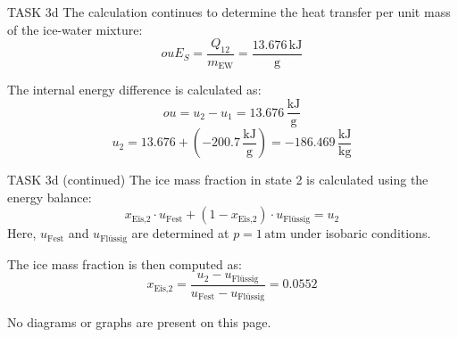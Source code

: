 TASK 3d  
The calculation continues to determine the heat transfer per unit mass of the ice-water mixture:  
\[
ouE_{S} = \frac{Q_{12}}{m_{\text{EW}}} = \frac{13.676 \, \text{kJ}}{\text{g}}
\]  

The internal energy difference is calculated as:  
\[
ou = u_2 - u_1 = 13.676 \, \frac{\text{kJ}}{\text{g}}
\]  
\[
u_2 = 13.676 + (-200.7 \, \frac{\text{kJ}}{\text{g}}) = -186.469 \, \frac{\text{kJ}}{\text{kg}}
\]  

TASK 3d (continued)  
The ice mass fraction in state 2 is calculated using the energy balance:  
\[
x_{\text{Eis,2}} \cdot u_{\text{Fest}} + (1 - x_{\text{Eis,2}}) \cdot u_{\text{Flüssig}} = u_2
\]  
Here, \( u_{\text{Fest}} \) and \( u_{\text{Flüssig}} \) are determined at \( p = 1 \, \text{atm} \) under isobaric conditions.  

The ice mass fraction is then computed as:  
\[
x_{\text{Eis,2}} = \frac{u_2 - u_{\text{Flüssig}}}{u_{\text{Fest}} - u_{\text{Flüssig}}} = 0.0552
\]  

No diagrams or graphs are present on this page.